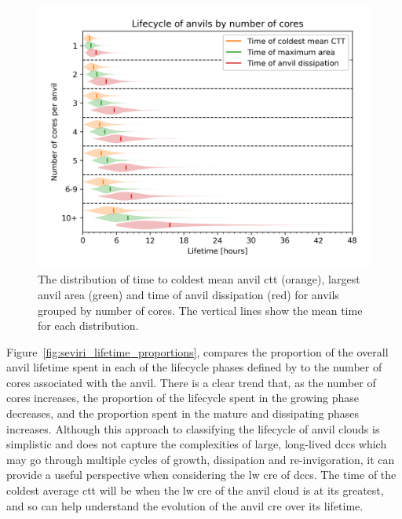 \begin{figure}[tp]
    \includegraphics[width=\textwidth]{figures/chapter4_11.png}
    \caption[
    The distribution of time to coldest mean anvil \acrshort{ctt}, largest anvil area and time of anvil dissipation
    ]{
    The distribution of time to coldest mean anvil \acrshort{ctt} (orange), largest anvil area (green) and time of anvil dissipation (red) for anvils grouped by number of cores. The vertical lines show the mean time for each distribution.
    }
    \label{fig:seviri_lifetime_dists}
\end{figure}


Figure~\ref{fig:seviri_lifetime_proportions}, compares the proportion of the overall anvil lifetime spent in each of the lifecycle phases defined by \citet{futyan_deep_2007} to the number of cores associated with the anvil. 
There is a clear trend that, as the number of cores increases, the proportion of the lifecycle spent in the growing phase decreases, and the proportion spent in the mature and dissipating phases increases.
 Although this approach to classifying the lifecycle of anvil clouds is simplistic and does not capture the complexities of large, long-lived \acrshort{dcc}s which may go through multiple cycles of growth, dissipation and re-invigoration, it can provide a useful perspective when considering the \acrshort{lw} \acrshort{cre} of \acrshort{dcc}s. 
 The time of the coldest average \acrshort{ctt} will be when the \acrshort{lw} \acrshort{cre} of the anvil cloud is at its greatest, and so can help understand the evolution of the anvil \acrshort{cre} over its lifetime.


